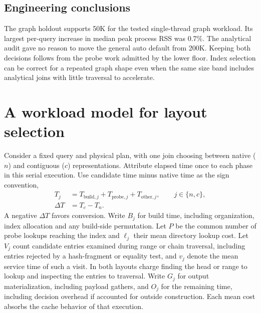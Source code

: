 \documentclass[11pt,a4paper]{article}
\begin{document}
\subsection{Engineering conclusions}
The graph holdout supports 50K for the tested single-thread graph workload. Its largest per-query
increase in median peak process RSS was 0.7\%. The analytical audit gave no reason to move the
general auto default from 200K. Keeping both decisions follows from the probe work admitted by the
lower floor. Index selection can be correct for a repeated graph shape even when the same size
band includes analytical joins with little traversal to accelerate.

\section{A workload model for layout selection}
\label{sec:model}
Consider a fixed query and physical plan, with one join choosing between native ($n$) and
contiguous ($c$) representations. Attribute elapsed time once to each phase in this serial
execution. Use candidate time minus native time as the sign convention,
\begin{align}
 T_j &= T_{\mathrm{build},j}+T_{\mathrm{probe},j}+T_{\mathrm{other},j},
       \qquad j\in\{n,c\}, \label{eq:total}\\
 \Delta T &= T_c-T_n. \label{eq:delta}
\end{align}
A negative $\Delta T$ favors conversion. Write $B_j$ for build time, including organization, index
allocation and any build-side permutation. Let $P$ be the common number of probe lookups reaching
the index and $\ell_j$ their mean directory lookup cost. Let $V_j$ count candidate entries
examined during range or chain traversal, including entries rejected by a hash-fragment or
equality test, and $v_j$ denote the mean service time of such a visit. In both layouts charge
finding the head or range to lookup and inspecting the entries to traversal. Write $G_j$ for
output materialization, including payload gathers, and $O_j$ for the remaining time, including
decision overhead if accounted for outside construction. Each mean cost absorbs the cache behavior
of that execution.
\end{document}
